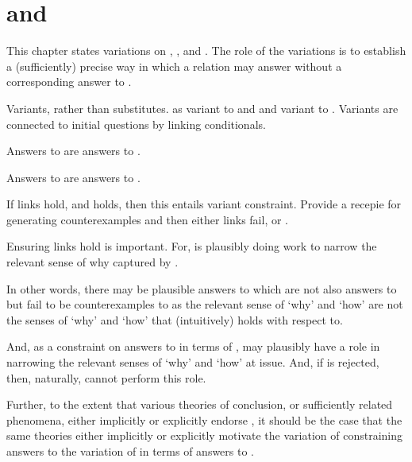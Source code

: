 \chapter{\qWhyV{} and \qHowV{}}
\label{cha:var}

\begin{note}
  This chapter states variations on \qWhy{}, \qHow{}, and \issueInclusion{}.
  The role of the variations is to establish a (sufficiently) precise way in which a relation may answer \qWhy{} without a corresponding answer to \qHow{}.

  Variants, rather than substitutes.
  \qWhyV{} as variant to \qWhy{} and \qHowV{} and variant to \qHow{}.
  Variants are connected to initial questions by linking conditionals.

  \begin{TOCEnum}
  \item

    Answers to \qWhyV{} are answers to \qWhy{}.
  \item

    Answers to \qHow{} are answers to \qHowV{}.
  \item

    If links hold, and \issueConstraint{} holds, then this entails variant constraint.
  Provide a recepie for generating counterexamples and then either links fail, or \issueConstraint{}.
  \end{TOCEnum}
\end{note}

\begin{note}
  Ensuring links hold is important.
  For, \issueInclusion{} is plausibly doing work to narrow the relevant sense of why captured by \qWhy{}.

  In other words, there may be plausible answers to \qWhy{} which are not also answers to \qHow{} but fail to be counterexamples to \issueInclusion{} as the relevant sense of `why' and `how' are not the senses of `why' and `how' that \issueInclusion{} (intuitively) holds with respect to.

  And, as a constraint on answers to \qWhy{} in terms of \qHow{}, \issueInclusion{} may plausibly have a role in narrowing the relevant senses of `why' and `how' at issue.
  And, if \issueInclusion{} is rejected, then, naturally, \issueInclusion{} cannot perform this role.

  Further, to the extent that various theories of conclusion, or sufficiently related phenomena, either implicitly or explicitly endorse \issueInclusion{}, it should be the case that the same theories either implicitly or explicitly motivate the variation of \issueConstraint{} constraining answers to the variation of \qWhy{} in terms of answers to \qHow{}.
\end{note}


